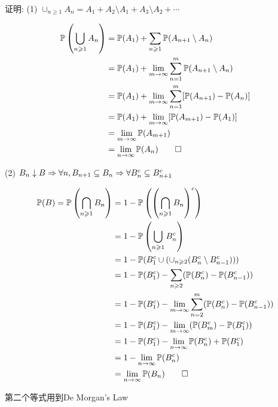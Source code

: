 证明: (1) $\cup_{n\geq 1}A_n=A_1+A_2\setminus A_1+A_3\setminus A_2+\cdots$

\[
\begin{aligned}
    \mathbb{P}\left(\bigcup_{n\geqslant 1}A_n\right)&=\mathbb{P}(A_1)+\sum_{n\geqslant 1}\mathbb{P}(A_{n+1}\setminus A_n)\\
    &=\mathbb{P}(A_1)+\lim_{m \to \infty}\sum_{n=1}^m \mathbb{P}(A_{n+1}\setminus A_n)\\
    &=\mathbb{P}(A_1)+\lim_{m \to \infty}\sum_{n=1}^m [\mathbb{P}(A_{n+1})-\mathbb{P}(A_n)]\\
    &=\mathbb{P}(A_1)+\lim_{m \to \infty}[\mathbb{P}(A_{m+1})-\mathbb{P}(A_1)]\\
    &=\lim_{m \to \infty} \mathbb{P}(A_{m+1})\\
    &=\lim_{n \to \infty} \mathbb{P}(A_n)\qed
\end{aligned}
\]

(2) $B_n\downarrow B\Rightarrow \forall n, B_{n+1}\subseteq B_n \Rightarrow \forall B_n^c\subseteq B_{n+1}^c$

\[
\begin{aligned}
    \mathbb{P}(B) = \mathbb{P}\left(\bigcap_{n\geqslant 1}B_n\right) &= 1-\mathbb{P}\left(\left(\bigcap_{n\geqslant 1}B_n\right)^c\right)\\
    &=1-\mathbb{P}\left(\bigcup_{n\geqslant 1}B_n^c\right)\\
    &=1-\mathbb{P}(B_1^c\cup (\cup_{n\geqslant 2}(B_n^c\setminus B_{n-1}^c)))\\
    &=1-\mathbb{P}(B_1^c)-\sum_{n\geqslant 2}(\mathbb{P}(B_n^c)-\mathbb{P}(B_{n-1}^c))\\
    &=1-\mathbb{P}(B_1^c)-\lim_{m \to \infty}\sum_{n=2}^m(\mathbb{P}(B_n^c)-\mathbb{P}(B_{n-1}^c))\\
    &=1-\mathbb{P}(B_1^c)-\lim_{m \to \infty}(\mathbb{P}(B_m^c)-\mathbb{P}(B_1^c))\\
    &=1-\mathbb{P}(B_1^c)-\lim_{n \to \infty}\mathbb{P}(B_n^c)+\mathbb{P}(B_1^c)\\
    &=1-\lim_{n \to \infty}\mathbb{P}(B_n^c)\\
    &=\lim_{n \to \infty}\mathbb{P}(B_n)\qed
\end{aligned}
\]

第二个等式用到De Morgan's Law

\newpage